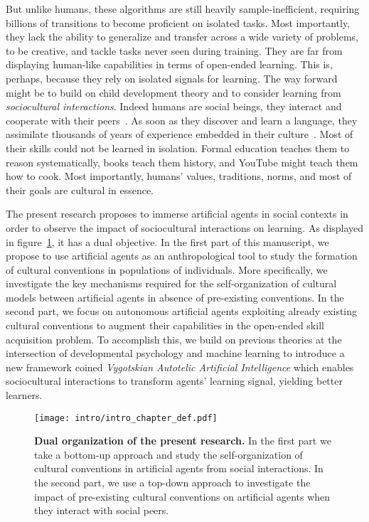 But unlike humans, these algorithms are still heavily sample-inefficient, requiring billions of transitions to become proficient on isolated tasks. Most importantly, they lack the ability to generalize and transfer across a wide variety of problems, to be creative, and tackle tasks never seen during training. They are far from displaying human-like capabilities in terms of open-ended learning. This is, perhaps, because they rely on isolated signals for learning. The way forward might be to build on child development theory and to consider learning from \textit{sociocultural interactions}. Indeed humans are social beings, they interact and cooperate with their peers~\citep{tomasello_cultural_1999,tomasello_understanding_2005, brewer2014addressing}. As soon as they discover and learn a language, they assimilate thousands of years of experience embedded in their culture~\citep{bruner1991narrative}.  Most of their skills could not be learned in isolation. Formal education teaches them to reason systematically, books teach them history, and YouTube might teach them how to cook. Most importantly, humans' values, traditions, norms, and most of their goals are cultural in essence.

The present research proposes to immerse artificial agents in social contexts in order to observe the impact of sociocultural interactions on learning. As displayed in figure~\ref{fig:intro_chapter_def}, it has a dual objective. In the first part of this manuscript, we propose to use artificial agents as an anthropological tool to study the formation of cultural conventions in populations of individuals. More specifically, we investigate the key mechanisms required for the self-organization of cultural models between artificial agents in absence of pre-existing conventions. In the second part, we focus on autonomous artificial agents exploiting already existing cultural conventions to augment their capabilities in the open-ended skill acquisition problem. To accomplish this, we build on previous theories at the intersection of developmental psychology and machine learning to introduce a new framework coined \textit{Vygotskian Autotelic Artificial Intelligence} which enables sociocultural interactions to transform agents' learning signal, yielding better learners. 

%
\begin{figure}[!h]
\centering
\texttt{[image: intro/intro\_chapter\_def.pdf]}
\caption{\textbf{Dual organization of the present research.} In the first part we take a bottom-up approach and study the self-organization of cultural conventions in artificial agents from social interactions. In the second part, we use a top-down approach to investigate the impact of pre-existing cultural conventions on artificial agents when they interact with social peers.}
\label{fig:intro_chapter_def}
\end{figure}

